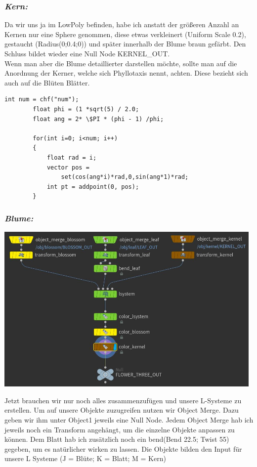\documentclass[paper=a4,fontsize=12pt,ngerman]{scrartcl}
\begin{document}
	\subsubsection*{\textit{Kern:}}
	Da wir uns ja im LowPoly befinden, habe ich anstatt der größeren Anzahl an Kernen nur eine Sphere genommen, diese etwas verkleinert (Uniform Scale 0.2), gestaucht (Radius(0;0.4;0)) und später innerhalb der Blume braun gefärbt. Den Schluss bildet wieder eine Null Node KERNEL\_OUT.\\
	Wenn man aber die Blume detaillierter darstellen möchte, sollte man auf die Anordnung der Kerner, welche sich Phyllotaxis nennt, achten. Diese bezieht sich auch auf die Blüten Blätter. 
	\begin{lstlisting}[basicstyle=\scriptsize]
		int num = chf("num");
		float phi = (1 *sqrt(5) / 2.0;
		float ang = 2* \$PI * (phi - 1) /phi;
		
		for(int i=0; i<num; i++)
		{
			float rad = i;
			vector pos = 
				set(cos(ang*i)*rad,0,sin(ang*1)*rad;
			int pt = addpoint(0, pos);
		}	
	\end{lstlisting} 
	\subsubsection*{\textit{Blume:}}
	\begin{minipage}{0.5\textwidth}
		\includegraphics[width=0.98\textwidth]{graphics/flower_three.JPG}
	\end{minipage}
	\begin{minipage}{0.5\textwidth}
		Jetzt brauchen wir nur noch alles zusammenzufügen und unsere L-Systeme zu erstellen. 
		Um auf unsere Objekte zuzugreifen nutzen wir Object Merge. Dazu geben wir ihm unter Object1 jeweils eine Null Node. Jedem Object Merge hab ich jeweils noch ein Transform angehängt, um die einzelne Objekte anpassen zu können. Dem Blatt hab ich zusätzlich noch ein bend(Bend 22.5; Twist 55) gegeben, um es natürlicher wirken zu lassen.
		Die Objekte bilden den Input für unsere L Systeme (J = Blüte; K = Blatt; M = Kern)
	\end{minipage}
\end{document}
